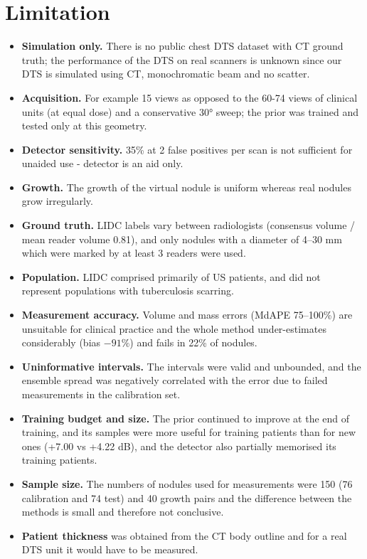\section{Limitation}

\begin{itemize}
  \item \textbf{Simulation only.} There is no public chest DTS dataset with CT ground truth; the performance of the DTS on real scanners is unknown since our DTS is simulated using CT, monochromatic beam and no scatter.\item \textbf{Acquisition.} For example 15 views as opposed to the 60-74 views of clinical units (at equal dose) and a conservative \ang{30} sweep; the prior was trained and tested only at this geometry.\item \textbf{Detector sensitivity.} 35\% at 2 false positives per scan is not sufficient for unaided use - detector is an aid only.\item \textbf{Growth.} The growth of the virtual nodule is uniform whereas real nodules grow irregularly.\item \textbf{Ground truth.} LIDC labels vary between radiologists (consensus volume / mean reader volume 0.81), and only nodules with a diameter of 4--30 mm which were marked by at least 3 readers were used.\item \textbf{Population.} LIDC comprised primarily of US patients, and did not represent populations with tuberculosis scarring.\item \textbf{Measurement accuracy.} Volume and mass errors (MdAPE 75--100\%) are unsuitable for clinical practice and the whole method under-estimates considerably (bias $-91\%$) and fails in 22\% of nodules.\item \textbf{Uninformative intervals.} The intervals were valid and unbounded, and the ensemble spread was negatively correlated with the error due to failed measurements in the calibration set.\item \textbf{Training budget and size.} The prior continued to improve at the end of training, and its samples were more useful for training patients than for new ones (+7.00 vs +4.22 dB), and the detector also partially memorised its training patients.\item \textbf{Sample size.} The numbers of nodules used for measurements were 150 (76 calibration and 74 test) and 40 growth pairs and the difference between the methods is small and therefore not conclusive.\item \textbf{Patient thickness} was obtained from the CT body outline and for a real DTS unit it would have to be measured.
\end{itemize}

